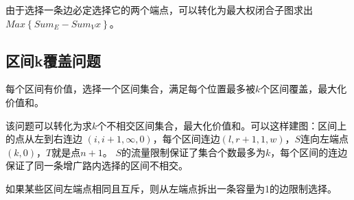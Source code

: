 由于选择一条边必定选择它的两个端点，可以转化为最大权闭合子图求出$Max\left\{Sum_E-Sum_Vx\right\}$。

\subsection{区间k覆盖问题}
每个区间有价值，选择一个区间集合，满足每个位置最多被$k$个区间覆盖，最大化价值和。

该问题可以转化为求$k$个不相交区间集合，最大化价值和。可以这样建图：区间上的点从左到右连边
$(i,i+1,\infty,0)$，每个区间连边$(l,r+1,1,w)$，$S$连向左端点$(k,0)$，$T$就是点$n+1$。
$S$的流量限制保证了集合个数最多为$k$，每个区间的连边保证了同一条增广路内选择的区间不相交。

如果某些区间左端点相同且互斥，则从左端点拆出一条容量为1的边限制选择。

